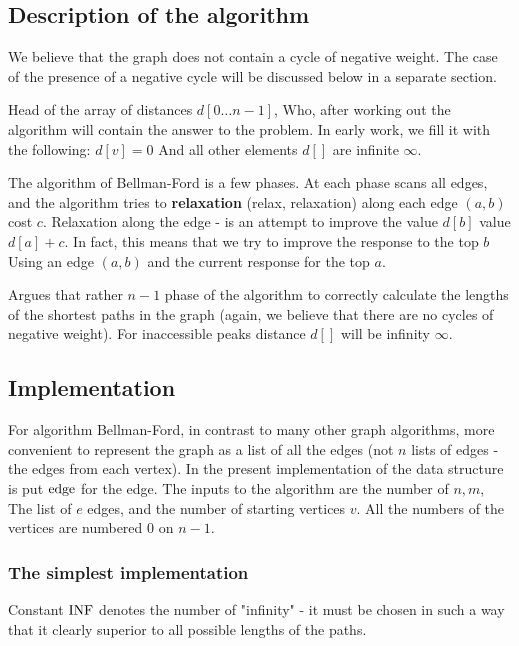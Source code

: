 \subsection{ Description of the algorithm }

We believe that the graph does not contain a cycle of negative weight. The case of the presence of a negative cycle will be discussed below in a separate section.

Head of the array of distances $d [0 \ldots n-1]$, Who, after working out the algorithm will contain the answer to the problem. In early work, we fill it with the following: $d [v] = 0$ And all other elements $d []$ are infinite $\infty$.

The algorithm of Bellman-Ford is a few phases. At each phase scans all edges, and the algorithm tries to \textbf{relaxation} (relax, relaxation) along each edge $(a, b)$ cost $c$. Relaxation along the edge - is an attempt to improve the value $d [b]$ value $d [a] + c$. In fact, this means that we try to improve the response to the top $b$ Using an edge $(a, b)$ and the current response for the top $a$.

Argues that rather $n-1$ phase of the algorithm to correctly calculate the lengths of the shortest paths in the graph (again, we believe that there are no cycles of negative weight). For inaccessible peaks distance $d []$ will be infinity $\infty$.

\subsection{ Implementation }

For algorithm Bellman-Ford, in contrast to many other graph algorithms, more convenient to represent the graph as a list of all the edges (not $n$ lists of edges - the edges from each vertex). In the present implementation of the data structure is put $\rm edge$ for the edge. The inputs to the algorithm are the number of $n, m$, The list of $e$ edges, and the number of starting vertices $v$. All the numbers of the vertices are numbered $0$ on $n-1$.

\subsubsection{ The simplest implementation }

Constant $\rm INF$ denotes the number of "infinity" - it must be chosen in such a way that it clearly superior to all possible lengths of the paths.

